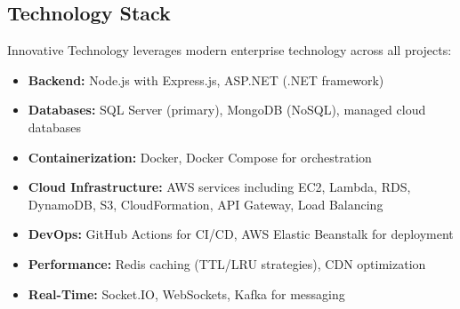 \subsection{Technology Stack}

Innovative Technology leverages modern enterprise technology across all projects:

\begin{itemize}
    \item \textbf{Backend:} Node.js with Express.js, ASP.NET (.NET framework)
    \item \textbf{Databases:} SQL Server (primary), MongoDB (NoSQL), managed cloud databases
    \item \textbf{Containerization:} Docker, Docker Compose for orchestration
    \item \textbf{Cloud Infrastructure:} AWS services including EC2, Lambda, RDS, DynamoDB, S3, CloudFormation, API Gateway, Load Balancing
    \item \textbf{DevOps:} GitHub Actions for CI/CD, AWS Elastic Beanstalk for deployment
    \item \textbf{Performance:} Redis caching (TTL/LRU strategies), CDN optimization
    \item \textbf{Real-Time:} Socket.IO, WebSockets, Kafka for messaging
\end{itemize}
